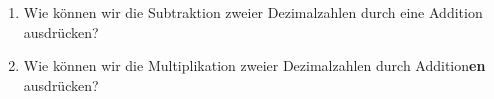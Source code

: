 \begin{exercise}
\begin{figure}[H]
\begin{minipage}{0.7\textwidth}
\begin{adjustbox}{width=\textwidth}
\end{adjustbox}

\end{minipage}
\end{figure}

%
%
%
%
%
%
%
%
\end{exercise}

\vspace{-0.5cm}

\begin{exercise}
\begin{enumerate}
\item Wie können wir die Subtraktion zweier Dezimalzahlen durch eine Addition ausdrücken?

\fillwithgrid	{0.5in}

\item Wie können wir die Multiplikation zweier Dezimalzahlen durch Addition\textbf{en} ausdrücken?


\end{enumerate}
\end{exercise}